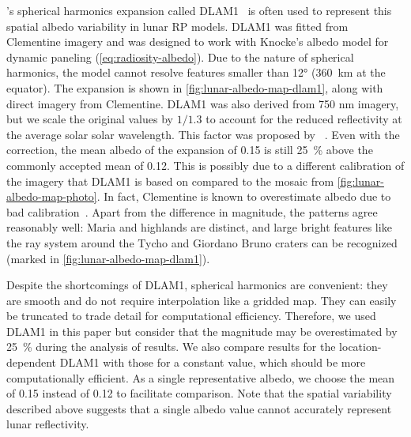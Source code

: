 \citeauthor{Floberghagen1999}'s  spherical harmonics expansion called \gls{DLAM1}~\cite{Floberghagen1999} is often used to represent this spatial albedo variability in lunar \gls{RP} models. \gls{DLAM1} was fitted from Clementine imagery and was designed to work with Knocke's albedo model for dynamic paneling (\cref{eq:radiosity-albedo}). Due to the nature of spherical harmonics, the model cannot resolve features smaller than \ang{12} (\qty{360}{\km} at the equator). The expansion is shown in \cref{fig:lunar-albedo-map-dlam1}, along with direct imagery from Clementine. \gls{DLAM1} was also derived from 750 nm imagery, but we scale the original values by $1/1.3$ to account for the reduced reflectivity at the average solar solar wavelength. This factor was proposed by \citeauthor{Vasavada2012}~\cite{Vasavada2012}. Even with the correction, the mean albedo of the expansion of 0.15 is still \qty{25}{\percent} above the commonly accepted mean of 0.12. This is possibly due to a different calibration of the imagery that \gls{DLAM1} is based on compared to the mosaic from \cref{fig:lunar-albedo-map-photo}. In fact, Clementine is known to overestimate albedo due to bad calibration~\cite{Shkuratov2011}. Apart from the difference in magnitude, the patterns agree reasonably well: Maria and highlands are distinct, and large bright features like the ray system around the Tycho and Giordano Bruno craters can be recognized (marked in \cref{fig:lunar-albedo-map-dlam1}).

Despite the shortcomings of \gls{DLAM1}, spherical harmonics are convenient: they are smooth and do not require interpolation like a gridded map. They can easily be truncated to trade detail for computational efficiency. Therefore, we used \gls{DLAM1} in this paper but consider that the magnitude may be overestimated by \qty{25}{\percent} during the analysis of results. We also compare results for the location-dependent \gls{DLAM1} with those for a constant value, which should be more computationally efficient. As a single representative albedo, we choose the mean of 0.15 instead of 0.12 to facilitate comparison. Note that the spatial variability described above suggests that a single albedo value cannot accurately represent lunar reflectivity.

